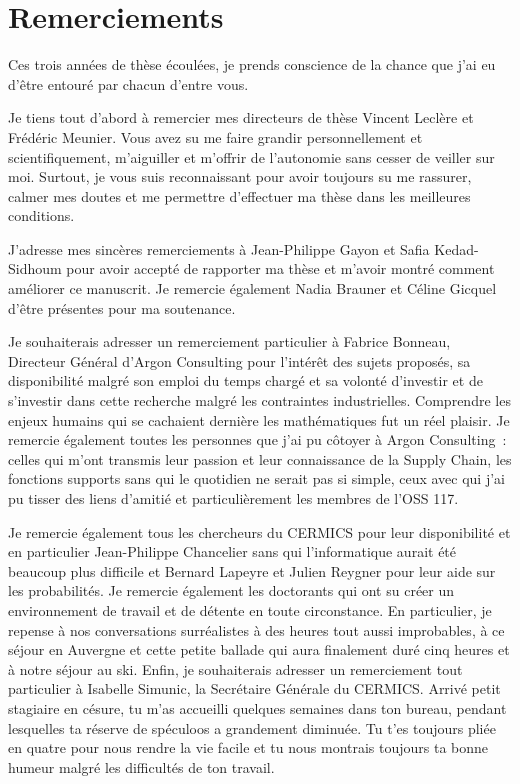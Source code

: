 \chapter*{Remerciements} %
\label{cha:remerciements}


Ces trois années de thèse écoulées, je prends conscience de la chance que j'ai eu d’être entouré par chacun d’entre vous.


Je tiens tout d’abord à remercier mes directeurs de thèse Vincent Leclère et Frédéric Meunier.
Vous avez su me faire grandir personnellement et scientifiquement, m’aiguiller et m’offrir de l’autonomie sans cesser de veiller sur moi.
Surtout, je vous suis reconnaissant pour avoir toujours su me rassurer, calmer mes doutes et me permettre d'effectuer ma thèse dans les meilleures conditions.


J’adresse mes sincères remerciements à Jean-Philippe Gayon et Safia Kedad-Sidhoum pour avoir accepté de rapporter ma thèse et m’avoir montré comment améliorer ce manuscrit.
Je remercie également Nadia Brauner et Céline Gicquel d’être présentes pour ma soutenance.


Je souhaiterais adresser un remerciement particulier à Fabrice Bonneau, Directeur Général d’Argon Consulting pour l’intérêt des sujets proposés, sa disponibilité malgré son emploi du temps chargé et sa volonté d’investir et de s’investir dans cette recherche malgré les contraintes industrielles.
Comprendre les enjeux humains qui se cachaient dernière les mathématiques fut un réel plaisir.
Je remercie également toutes les personnes que j’ai pu côtoyer à Argon Consulting~: celles qui m’ont transmis leur passion et leur connaissance de la Supply Chain, les fonctions supports sans qui le quotidien ne serait pas si simple, ceux avec qui j’ai pu tisser des liens d’amitié et particulièrement les membres de l’OSS 117.


Je remercie également tous les chercheurs du CERMICS pour leur disponibilité et en particulier Jean-Philippe Chancelier sans qui l’informatique aurait été beaucoup plus difficile et Bernard Lapeyre et Julien Reygner pour leur aide sur les probabilités.
Je remercie également les doctorants qui ont su créer un environnement de travail et de détente en toute circonstance.
En particulier, je repense à nos conversations surréalistes à des heures tout aussi improbables, à ce séjour en Auvergne et cette \og{}petite ballade\fg{} qui aura finalement duré cinq heures et à notre séjour au ski.
Enfin, je souhaiterais adresser un remerciement tout particulier à Isabelle Simunic, la Secrétaire Générale du CERMICS.
Arrivé petit stagiaire en césure, tu m’as accueilli quelques semaines dans ton bureau, pendant lesquelles ta réserve de spéculoos a grandement diminuée. Tu t’es toujours pliée en quatre pour nous rendre la vie facile et tu nous montrais toujours ta bonne humeur malgré les difficultés de ton travail.



